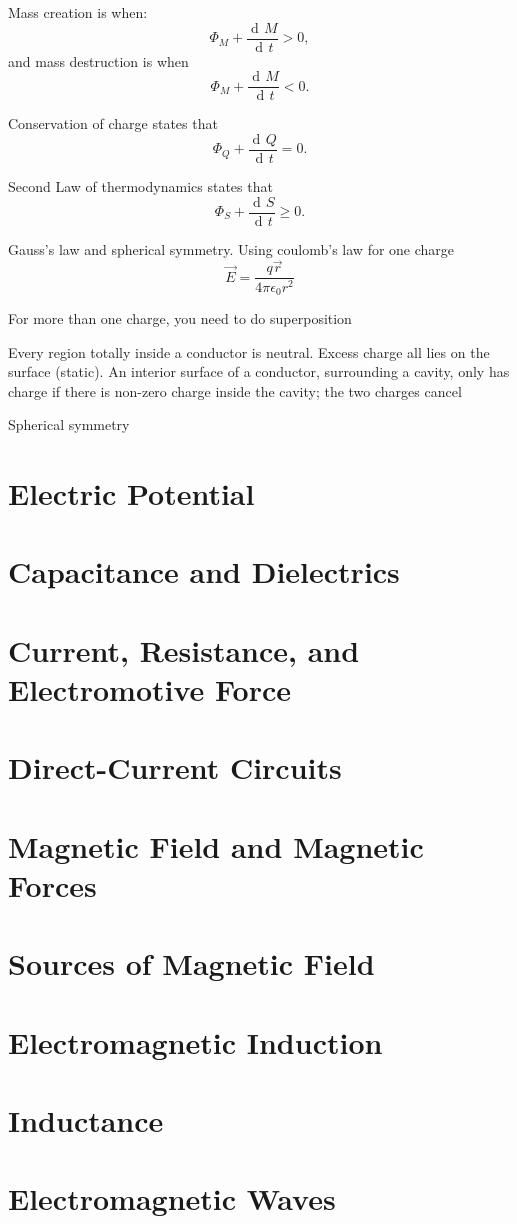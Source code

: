 \documentclass[11pt, letterpaper, titlepage]{report}
\DeclareMathOperator{\di}{d\!} %
\begin{document}
Mass creation is when:
\begin{equation}
\Phi_M + \frac{\di M}{\di t} > 0,
\end{equation}
and mass destruction is when
\begin{equation}
\Phi_M + \frac{\di M}{\di t} < 0.
\end{equation}

Conservation of charge states that
\begin{equation}
\Phi_Q + \frac{\di Q}{\di t} = 0.
\end{equation}

Second Law of thermodynamics states that
\begin{equation}
\Phi_S + \frac{\di S}{\di t} \geq 0.
\end{equation}

Gauss's law and spherical symmetry. Using coulomb's law for one charge
\begin{equation}
\vec{E} = \frac{q \vec{r}}{4 \pi \epsilon_0 r^2}
\end{equation}

For more than one charge, you need to do superposition

Every region totally inside a conductor is neutral. Excess charge all lies on the surface (static). An interior surface of a conductor, surrounding a cavity, only has charge if there is non-zero charge inside the cavity; the two charges cancel

Spherical symmetry 




\chapter{Electric Potential}
\chapter{Capacitance and Dielectrics}
\chapter{Current, Resistance, and Electromotive Force}
\chapter{Direct-Current Circuits}





\chapter{Magnetic Field and Magnetic Forces}
\chapter{Sources of Magnetic Field}
\chapter{Electromagnetic Induction}
\chapter{Inductance}
\chapter{Electromagnetic Waves}
\end{document}
